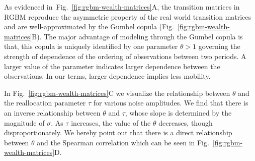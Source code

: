 \documentclass[11pt]{article}
\newcommand{\blue}[1]{{\color{blue} #1}}
\newcommand{\YB}[1]{\blue{{\it YB: #1 YB}}}
\newcommand{\fref}[1]{Fig.~\ref{fig:#1}}
\numberwithin{equation}{section}
\begin{document}
As evidenced in~\fref{rgbm-wealth-matrices}A, the transition matrices in RGBM reproduce the asymmetric property of the real world transition matrices and are well-approximated by the Gumbel copula (\fref{rgbm-wealth-matrices}B). The major advantage of modeling through the Gumbel copula is that, this copula is uniquely identified by one parameter $\theta>1$ governing the strength of dependence of the ordering of observations between two periods. A larger value of the parameter indicates larger dependence between the observations. In our terms, larger dependence implies less mobility.

In \fref{rgbm-wealth-matrices}C we visualize the relationship between $\theta$ and the reallocation parameter $\tau$ for various noise amplitudes. We find that there is an inverse relationship between $\theta$ and $\tau$, whose slope is determined by the magnitude of $\sigma$. As $\tau$ increases, the value of the $\theta$ decreases, though disproportionately. We hereby point out that there is a direct relationship between $\theta$ and the Spearman correlation which can be seen in \fref{rgbm-wealth-matrices}D. %
\end{document}
